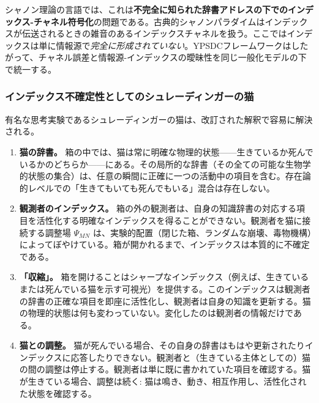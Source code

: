 \documentclass[12pt,a4paper]{article}
\theoremstyle{definition}
\theoremstyle{remark}
\begin{document}
	シャノン理論の言語では、これは\textbf{不完全に知られた辞書アドレスの下でのインデックス-チャネル符号化}の問題である。古典的シャノンパラダイムはインデックスが伝送されるときの雑音のあるインデックスチャネルを扱う。ここではインデックスは単に情報源で\emph{完全に形成されていない}。YPSDCフレームワークはしたがって、チャネル誤差と情報源-インデックスの曖昧性を同じ一般化モデルの下で統一する。
	
	\medskip
	
	\subsubsection{インデックス不確定性としてのシュレーディンガーの猫}
	
	有名な思考実験であるシュレーディンガーの猫は、改訂された解釈で容易に解決される。
	
	\begin{enumerate}[leftmargin=*]
		\item \textbf{猫の辞書。} 箱の中では、猫は常に明確な物理的状態——生きているか死んでいるかのどちらか——にある。その局所的な辞書（その全ての可能な生物学的状態の集合）は、任意の瞬間に正確に一つの活動中の項目を含む。存在論的レベルでの「生きてもいても死んでもいる」混合は存在しない。
		
		\item \textbf{観測者のインデックス。} 箱の外の観測者は、自身の知識辞書の対応する項目を活性化する明確なインデックスを得ることができない。観測者を猫に接続する調整場 $\Psi_{MN}$ は、実験的配置（閉じた箱、ランダムな崩壊、毒物機構）によってぼやけている。箱が開かれるまで、インデックスは本質的に不確定である。
		
		\item \textbf{「収縮」。} 箱を開けることはシャープなインデックス（例えば、生きているまたは死んでいる猫を示す可視光）を提供する。このインデックスは観測者の辞書の正確な項目を即座に活性化し、観測者は自身の知識を更新する。猫の物理的状態は何も変わっていない。変化したのは観測者の情報だけである。
		
		\item \textbf{猫との調整。} 猫が死んでいる場合、その自身の辞書はもはや更新されたりインデックスに応答したりできない。観測者と（生きている主体としての）猫の間の調整は停止する。観測者は単に既に書かれていた項目を確認する。猫が生きている場合、調整は続く: 猫は鳴き、動き、相互作用し、活性化された状態を確認する。
	\end{enumerate}
	
\end{document}
